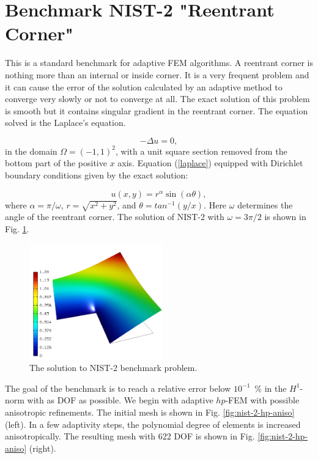 \section{Benchmark NIST-2 "Reentrant Corner"}
\label{sec:bench-2}

This is a standard benchmark for adaptive FEM algorithms.
A reentrant corner is nothing more than an internal or inside corner.
It is a very frequent problem and it can cause the error of the solution calculated by an adaptive method to converge very slowly or not to converge at all.
The exact solution of this problem is smooth but it contains
singular gradient in the reentrant corner.
The equation solved is the Laplace's equation.

\begin{equation} \label{laplace}
-\Delta u = 0,
\end{equation}
in the domain $\Omega = (-1, 1)^2$, with a unit square
section removed from the bottom part of the positive $x$ axis.
Equation (\ref{laplace}) equipped with Dirichlet
boundary conditions given by the exact solution:

\begin{equation}\label{exact-nist-2}
u(x, y) = r^{\alpha}\sin(\alpha \theta),
\end{equation}
where $\alpha = \pi / \omega$, $r = \sqrt{x^2+y^2}$,
and $\theta = tan^{-1}(y/x)$. Here $\omega $ determines
the angle of the reentrant corner.
The solution of NIST-2 with $\omega = 3 \pi / 2$
is shown in Fig. \ref{fig:sln-nist02}.

\begin{figure}[!ht]
\centering
\includegraphics[height=5cm]{nist/nist-2/solution.png}
\caption{The solution to NIST-2 benchmark problem.}
\label{fig:sln-nist02}
\end{figure}
\noindent

The goal of the benchmark is to reach a relative error below
$10^{-1}$~\% in the $H^1$-norm with as DOF 
as possible.
We begin with adaptive $hp$-FEM with possible anisotropic refinements.
The initial mesh is shown in Fig. \ref{fig:nist-2-hp-aniso} (left).
In a few adaptivity steps, the polynomial degree of elements is increased
anisotropically.
The resulting mesh with 622 DOF is shown in Fig. \ref{fig:nist-2-hp-aniso} (right).

